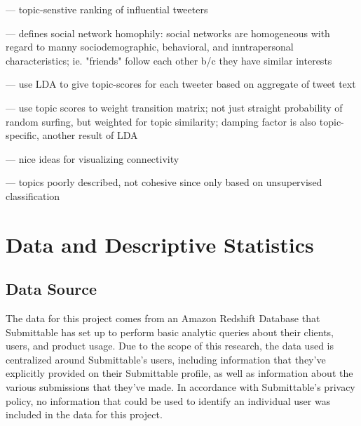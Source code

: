 \documentclass[]{report}   %
\begin{document}
--- topic-senstive ranking of influential tweeters

--- defines social network homophily: social networks are homogeneous with regard to manny sociodemographic, behavioral, and inntrapersonal characteristics; ie. "friends" follow each other b/c they have similar interests

--- use LDA to give topic-scores for each tweeter based on aggregate of tweet text

--- use topic scores to weight transition matrix; not just straight probability of random surfing, but weighted for topic similarity; damping factor is also topic-specific, another result of LDA

--- nice ideas for visualizing connectivity

--- topics poorly described, not cohesive since only based on unsupervised classification


\chapter{Data and Descriptive Statistics}         
\section{Data Source}
The data for this project comes from an Amazon Redshift Database that Submittable has set up to perform basic analytic queries about their clients, users, and product usage. Due to the scope of this research, the data used is centralized around Submittable's users, including information that they've explicitly provided on their Submittable profile, as well as information about the various submissions that they've made. In accordance with Submittable's privacy policy, no information that could be used to identify an individual user was included in the data for this project.
\end{document}
